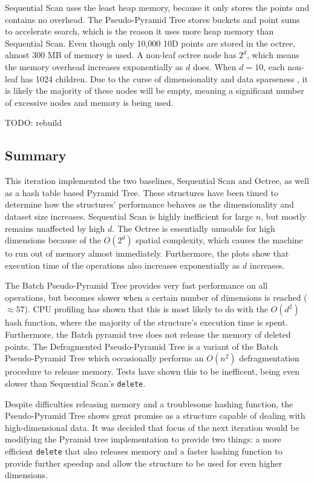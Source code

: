 Sequential Scan uses the least heap memory, because it only stores the points and contains no overhead. The Pseudo-Pyramid Tree stores buckets and point sums to accelerate search, which is the reason it uses more heap memory than Sequential Scan. Even though only 10,000 10D points are stored in the octree, almost 300 MB of memory is used. A non-leaf octree node has $2^d$, which means the memory overhead increases exponentially as $d$ does. When $d = 10$, each non-leaf has 1024 children. Due to the curse of dimensionality and data sparseness \cite{data-sparseness}, it is likely the majority of these nodes will be empty, meaning a significant number of excessive nodes and memory is being used.

TODO: rebuild

\subsection{Summary}

This iteration implemented the two baselines, Sequential Scan and Octree, as well as a hash table based Pyramid Tree. These structures have been timed to determine how the structures' performance behaves as the dimensionality and dataset size increases. Sequential Scan is highly inefficient for large $n$, but mostly remains unaffected by high $d$. The Octree is essentially unusable for high dimensions because of the $O(2^d)$ spatial complexity, which causes the machine to run out of memory almost immediately. Furthermore, the plots show that execution time of the operations also increases exponentially as $d$ increases.

The Batch Pseudo-Pyramid Tree provides very fast performance on all operations, but becomes slower when a certain number of dimensions is reached ($\approx 57$). CPU profiling has shown that this is most likely to do with the $O(d^2)$ hash function, where the majority of the structure's execution time is spent. Furthermore, the Batch pyramid tree does not release the memory of deleted points. The Defragmented Pseudo-Pyramid Tree is a variant of the Batch Pseudo-Pyramid Tree which occasionally performs an $O(n^2)$ defragmentation procedure to release memory. Tests have shown this to be inefficent, being even slower than Sequential Scan's \texttt{delete}.

Despite difficulties releasing memory and a troublesome hashing function, the Pseudo-Pyramid Tree shows great promise as a structure capable of dealing with high-dimensional data. It was decided that focus of the next iteration would be modifying the Pyramid tree implementation to provide two things: a more efficient \texttt{delete} that also releases memory and a faster hashing function to provide further speedup and allow the structure to be used for even higher dimensions.